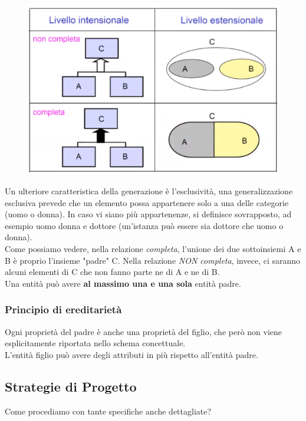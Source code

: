 \documentclass[12pt, a4paper]{article}
\begin{document}
    \begin{figure}[htbp]
        \centering
        \includegraphics[scale=0.7]{generalizzazione.png}
        
        \label{<label>}
    \end{figure}
 Un ulteriore caratteristica della generazione è l’esclusività, una generalizzazione esclusiva prevede che un elemento possa appartenere solo a una delle categorie (uomo o donna). In caso vi siano più appartenenze, si definisce sovrapposto, ad esempio uomo donna e dottore (un’istanza può essere sia dottore che uomo o donna). 
    \\Come possiamo vedere, nella relazione  \textit{completa}, l'unione dei due sottoinsiemi A e B è proprio 
    l'insieme "padre" C. Nella relazione \textit{NON completa}, invece, ci saranno alcuni elementi di C che non fanno
    parte ne di A e ne di B.
    \\
    Una entità può avere \textbf{al massimo una e una sola} entità padre.

    \subsubsection{Principio di ereditarietà}
    Ogni proprietà del padre è anche una proprietà del figlio, che però non viene esplicitamente riportata nello schema concettuale.
    \\L'entità figlio può avere degli attributi in più rispetto all'entità padre.

    \newpage
    \subsection{Strategie di Progetto}
    Come procediamo con tante specifiche anche dettagliate?
\end{document}
